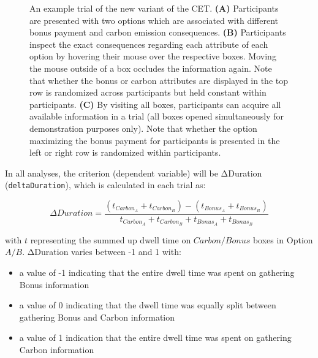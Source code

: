\documentclass[
  letterpaper,
  DIV=11,
  numbers=noendperiod]{scrartcl}
\providecommand{\tightlist}{%
  \setlength{\itemsep}{0pt}\setlength{\parskip}{0pt}}\usepackage{longtable,booktabs,array}
\begin{document}
\begin{figure}


\caption{\label{fig-decisionScreen}An example trial of the new variant
of the CET. \textbf{(A)} Participants are presented with two options
which are associated with different bonus payment and carbon emission
consequences. \textbf{(B)} Participants inspect the exact consequences
regarding each attribute of each option by hovering their mouse over the
respective boxes. Moving the mouse outside of a box occludes the
information again. Note that whether the bonus or carbon attributes are
displayed in the top row is randomized across participants but held
constant within participants. \textbf{(C)} By visiting all boxes,
participants can acquire all available information in a trial (all boxes
opened simultaneously for demonstration purposes only). Note that
whether the option maximizing the bonus payment for participants is
presented in the left or right row is randomized within participants.}

\end{figure}%

In all analyses, the criterion (dependent variable) will be ΔDuration
(\texttt{deltaDuration}), which is calculated in each trial as:

\[
\Delta Duration = \frac{(t_{Carbon_{A}} + t_{Carbon_{B}}) - (t_{Bonus_{A}} + t_{Bonus_{B}})}{t_{Carbon_{A}} + t_{Carbon_{B}} + t_{Bonus_{A}} + t_{Bonus_{B}}}
\]

with \(t\) representing the summed up dwell time on \(Carbon/Bonus\)
boxes in Option \(A/B\). ΔDuration varies between -1 and 1 with:

\begin{itemize}
\tightlist
\item
  a value of -1 indicating that the entire dwell time was spent on
  gathering Bonus information
\item
  a value of 0 indicating that the dwell time was equally split between
  gathering Bonus and Carbon information
\item
  a value of 1 indication that the entire dwell time was spent on
  gathering Carbon information
\end{itemize}
\end{document}
